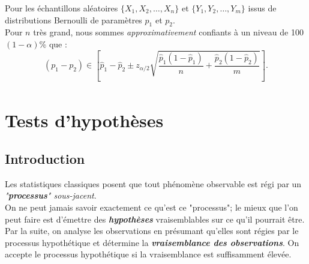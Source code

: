 \documentclass[10pt, french]{article}
\begin{document}
\begin{multicols*}{2}
\begin{definitionNOHFILLsub}
Pour les échantillons aléatoires $\{X_{1}, X_{2}, \dots, X_{n}\}$ et $\{Y_{1}, Y_{2}, \dots, Y_{m}\}$ issus de distributions Bernoulli de paramètres $p_{1}$ et $p_{2}$.\\

Pour $n$ très grand, nous sommes \textit{approximativement} confiants à un niveau de 100$(1 - \alpha)$\% que :
\begin{equation*}
	(p_{1}	-	p_{2}) \in \left[ 
	\hat{p}_{1}	-	\hat{p}_{2}
	\pm	z_{\alpha/2} \sqrt{\frac{\hat{p}_{1}(1 - \hat{p}_{1})}{n} + \frac{\hat{p}_{2}(1 - \hat{p}_{2})}{m}} \right].
\end{equation*}
\begin{align*}
\end{align*}
\end{definitionNOHFILLsub}



\columnbreak
\section{Tests d'hypothèses}
\label{sec:hyp-test}
\subsection{Introduction}
\begin{rappel_enhanced}[Contexte]
Les statistiques classiques posent que tout phénomène observable est régi par un \textit{"\textbf{processus}" sous-jacent}.\\
On ne peut jamais savoir exactement ce qu'est ce "processus"; le mieux que l'on peut faire est d'émettre des \textit{\textbf{hypothèses}} vraisemblables sur ce qu'il pourrait être. \\
Par la suite, on analyse les observations en présumant qu'elles sont régies par le processus hypothétique et détermine la \textit{\textbf{vraisemblance des observations}}. On accepte le processus hypothétique si la vraisemblance est suffisamment élevée.
\end{rappel_enhanced}


\end{multicols*}
\end{document}
